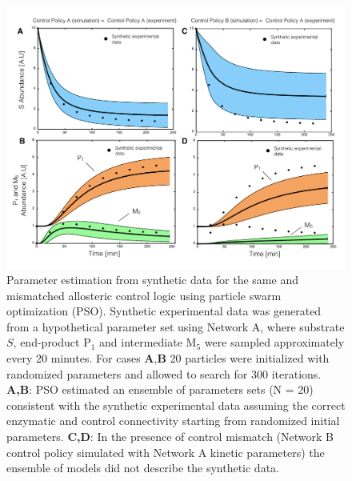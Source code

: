 \documentclass[12pt]{article}
\begin{document}
\clearpage

\begin{figure}
\centering
\includegraphics[width=1.0\textwidth]{./figs/Figure-5-ParameterFit.pdf}
\caption{Parameter estimation from synthetic data for the same and mismatched allosteric control logic using particle swarm optimization (PSO). 
Synthetic experimental data was generated from a hypothetical parameter set using Network A, 
where substrate $S$, end-product P$_{1}$ and intermediate M$_5$ were sampled approximately every 20 minutes. 
For cases $\textbf{A,B}$ 20 particles were initialized with randomized parameters and allowed to search for 300 iterations. 
\textbf{A,B}: PSO estimated an ensemble of parameters sets (N = 20) consistent with the synthetic experimental data assuming the correct
enzymatic and control connectivity starting from randomized initial parameters.
\textbf{C,D}: In the presence of control mismatch (Network B control policy simulated with Network A kinetic parameters) 
the ensemble of models did not describe the synthetic data. 
}\label{fig-parameter-fit}
\end{figure}

\clearpage
\end{document}
